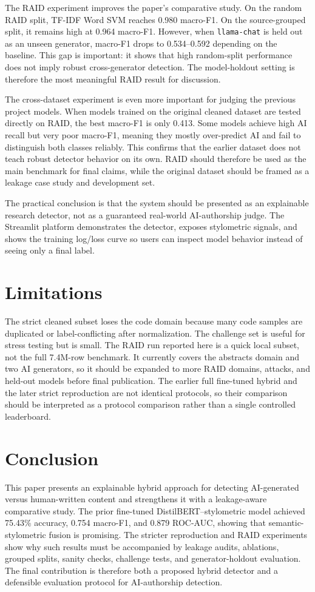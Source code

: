 \documentclass[conference]{IEEEtran}
\begin{document}
The RAID experiment improves the paper's comparative study. On the random RAID split, TF-IDF Word SVM reaches 0.980 macro-F1. On the source-grouped split, it remains high at 0.964 macro-F1. However, when \texttt{llama-chat} is held out as an unseen generator, macro-F1 drops to 0.534--0.592 depending on the baseline. This gap is important: it shows that high random-split performance does not imply robust cross-generator detection. The model-holdout setting is therefore the most meaningful RAID result for discussion.

The cross-dataset experiment is even more important for judging the previous project models. When models trained on the original cleaned dataset are tested directly on RAID, the best macro-F1 is only 0.413. Some models achieve high AI recall but very poor macro-F1, meaning they mostly over-predict AI and fail to distinguish both classes reliably. This confirms that the earlier dataset does not teach robust detector behavior on its own. RAID should therefore be used as the main benchmark for final claims, while the original dataset should be framed as a leakage case study and development set.

The practical conclusion is that the system should be presented as an explainable research detector, not as a guaranteed real-world AI-authorship judge. The Streamlit platform demonstrates the detector, exposes stylometric signals, and shows the training log/loss curve so users can inspect model behavior instead of seeing only a final label.

\section{Limitations}
The strict cleaned subset loses the code domain because many code samples are duplicated or label-conflicting after normalization. The challenge set is useful for stress testing but is small. The RAID run reported here is a quick local subset, not the full 7.4M-row benchmark. It currently covers the abstracts domain and two AI generators, so it should be expanded to more RAID domains, attacks, and held-out models before final publication. The earlier full fine-tuned hybrid and the later strict reproduction are not identical protocols, so their comparison should be interpreted as a protocol comparison rather than a single controlled leaderboard.

\section{Conclusion}
This paper presents an explainable hybrid approach for detecting AI-generated versus human-written content and strengthens it with a leakage-aware comparative study. The prior fine-tuned DistilBERT--stylometric model achieved 75.43\% accuracy, 0.754 macro-F1, and 0.879 ROC-AUC, showing that semantic-stylometric fusion is promising. The stricter reproduction and RAID experiments show why such results must be accompanied by leakage audits, ablations, grouped splits, sanity checks, challenge tests, and generator-holdout evaluation. The final contribution is therefore both a proposed hybrid detector and a defensible evaluation protocol for AI-authorship detection.



\end{document}
